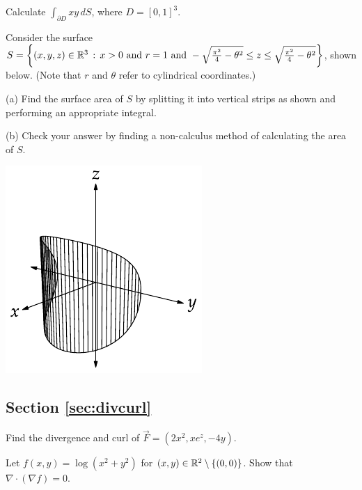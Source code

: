\documentclass[svgnames]{watsonbook}
\begin{document}
\begin{exercise}{}{}
  Calculate $\int_{\partial D}xy\,dS$, where $D=[0,1]^3$.
\end{exercise}


\begin{exercise}{}{}
  Consider the surface
  $S=\left\{(x,y,z)\in \mathbb{R}^3\,:\,x>0\text{ and }r = 1\text{ and
    }-\sqrt{\frac{\pi^2}{4}-\theta^2}\leq z\leq
    \sqrt{\frac{\pi^2}{4}-\theta^2}\right\}$, shown below. (Note that
  $r$ and $\theta$ refer to cylindrical coordinates.)

  (a) Find the surface area of $S$ by splitting it into vertical
  strips as shown and performing an appropriate integral. 

  (b) Check your answer by finding a non-calculus method of
  calculating the area of $S$.

\begin{center}
  \includegraphics{exercisefigures/label}
\end{center}
\end{exercise}

\subsection*{Section \ref{sec:divcurl}}

\begin{exercise}{}{}
  Find the divergence and curl of $\vec{F} = (2x^2, xe^z, -4y)$.
\end{exercise}

\begin{exercise}{}{}
  Let $f(x,y) = \log(x^2 + y^2)$ for
  $(x,y)\in \mathbb{R}^2 \setminus \{(0,0)\}$. Show that
  $\nabla \cdot (\nabla f) = 0$.
\end{exercise}
\end{document}
